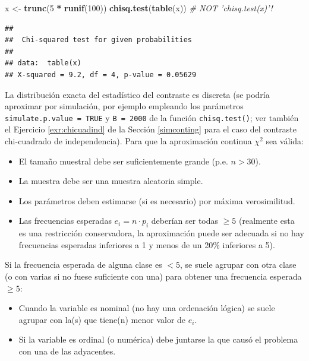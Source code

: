 \documentclass[
]{book}
\newenvironment{Shaded}{\begin{snugshade}}{\end{snugshade}}
\newcommand{\CommentTok}[1]{\textcolor[rgb]{0.56,0.35,0.01}{\textit{#1}}}
\newcommand{\DecValTok}[1]{\textcolor[rgb]{0.00,0.00,0.81}{#1}}
\newcommand{\KeywordTok}[1]{\textcolor[rgb]{0.13,0.29,0.53}{\textbf{#1}}}
\newcommand{\NormalTok}[1]{#1}
\newcommand{\OperatorTok}[1]{\textcolor[rgb]{0.81,0.36,0.00}{\textbf{#1}}}
\newcommand{\StringTok}[1]{\textcolor[rgb]{0.31,0.60,0.02}{#1}}
\theoremstyle{break}
\theoremstyle{definition}
\theoremstyle{definition}
\theoremstyle{definition}
\theoremstyle{remark}
\begin{document}
\begin{Shaded}
\begin{Highlighting}[]
\NormalTok{x <-}\StringTok{ }\KeywordTok{trunc}\NormalTok{(}\DecValTok{5} \OperatorTok{*}\StringTok{ }\KeywordTok{runif}\NormalTok{(}\DecValTok{100}\NormalTok{))}
\KeywordTok{chisq.test}\NormalTok{(}\KeywordTok{table}\NormalTok{(x))            }\CommentTok{# NOT 'chisq.test(x)'!}
\end{Highlighting}
\end{Shaded}

\begin{verbatim}
## 
##  Chi-squared test for given probabilities
## 
## data:  table(x)
## X-squared = 9.2, df = 4, p-value = 0.05629
\end{verbatim}

La distribución exacta del estadístico del contraste es discreta (se podría aproximar por simulación, por ejemplo empleando los parámetros \texttt{simulate.p.value\ =\ TRUE} y \texttt{B\ =\ 2000} de la función \texttt{chisq.test()}; ver también el Ejercicio \ref{exr:chicuadind} de la Sección \ref{simconting} para el caso del contraste chi-cuadrado de independencia).
Para que la aproximación continua \(\chi^2\) sea válida:

\begin{itemize}
\item
  El tamaño muestral debe ser suficientemente grande (p.e. \(n>30\)).
\item
  La muestra debe ser una muestra aleatoria simple.
\item
  Los parámetros deben estimarse (si es necesario) por máxima
  verosimilitud.
\item
  Las frecuencias esperadas \(e_{i}=n\cdot p_{i}\) deberían ser todas
  \(\geq5\) (realmente esta es una restricción conservadora, la aproximación
  puede ser adecuada si no hay frecuencias esperadas inferiores a 1 y
  menos de un 20\% inferiores a 5).
\end{itemize}

Si la frecuencia esperada de alguna clase es \(<5\), se suele agrupar con otra
clase (o con varias si no fuese suficiente con una) para obtener una
frecuencia esperada \(\geq5\):

\begin{itemize}
\item
  Cuando la variable es nominal (no hay una ordenación lógica) se
  suele agrupar con la(s) que tiene(n) menor valor de \(e_{i}\).
\item
  Si la variable es ordinal (o numérica) debe juntarse la que causó el
  problema con una de las adyacentes.
\end{itemize}
\end{document}
